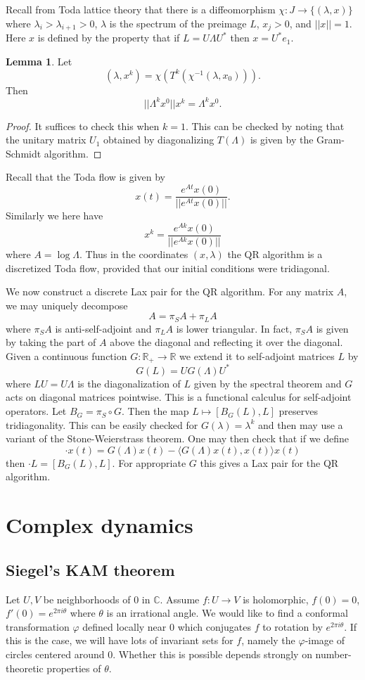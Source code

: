 \documentclass[12pt]{report}
\newcommand{\RR}{\mathbb{R}}
\newcommand{\CC}{\mathbb{C}}
\theoremstyle{definition}
\newtheorem{lemma}[theorem]{Lemma}
\begin{document}
Recall from Toda lattice theory that there is a diffeomorphism $\chi: J \to \{(\lambda, x)\}$ where $\lambda_i > \lambda_{i+1} > 0$, $\lambda$ is the spectrum of the preimage $L$, $x_j > 0$, and $||x|| = 1$.
Here $x$ is defined by the property that if $L = U\Lambda U^*$ then $x = U^*e_1$.
\begin{lemma}
Let
$$(\lambda, x^k) = \chi(T^k(\chi^{-1}(\lambda, x_0))).$$
Then
$$||\Lambda^k x^0|| x^k = \Lambda^k x^0.$$
\end{lemma}
\begin{proof}
It suffices to check this when $k = 1$. This can be checked by noting that the unitary matrix $U_1$ obtained by diagonalizing $T(\Lambda)$ is given by the Gram-Schmidt algorithm.
\end{proof}
Recall that the Toda flow is given by
$$x(t) = \frac{e^{At}x(0)}{||e^{At}x(0)||}.$$
Similarly we here have
$$x^k = \frac{e^{Ak} x(0)}{||e^{Ak} x(0)||}$$
where $A = \log \Lambda$.
Thus in the coordinates $(x, \lambda)$ the QR algorithm is a discretized Toda flow, provided that our initial conditions were tridiagonal.

We now construct a discrete Lax pair for the QR algorithm. For any matrix $A$, we may uniquely decompose
$$A = \pi_SA + \pi_LA$$
where $\pi_SA$ is anti-self-adjoint and $\pi_LA$ is lower triangular. In fact, $\pi_SA$ is given by taking the part of $A$ above the diagonal and reflecting it over the diagonal.
Given a continuous function $G: \RR_+ \to \RR$ we extend it to self-adjoint matrices $L$ by
$$G(L) = U G(\Lambda) U^*$$
where $LU = U\Lambda$ is the diagonalization of $L$ given by the spectral theorem and $G$ acts on diagonal matrices pointwise.
This is a functional calculus for self-adjoint operators.
Let $B_G = \pi_S \circ G$. Then the map $L \mapsto [B_G(L), L]$ preserves tridiagonality. This can be easily checked for $G(\lambda) = \lambda^k$ and then may use a variant of the Stone-Weierstrass theorem.
One may then check that if we define
$$\cdot x(t) = G(\Lambda)x(t) - \langle G(\Lambda)x(t), x(t)\rangle x(t)$$
then $\cdot L = [B_G(L), L]$. For appropriate $G$ this gives a Lax pair for the QR algorithm.

\chapter{Complex dynamics}
\section{Siegel's KAM theorem}
Let $U,V$ be neighborhoods of $0$ in $\CC$. Assume $f: U \to V$ is holomorphic, $f(0) = 0$, $f'(0) = e^{2\pi i\theta}$ where $\theta$ is an irrational angle.
We would like to find a conformal transformation $\varphi$ defined locally near $0$ which conjugates $f$ to rotation by $e^{2\pi i\theta}$.
If this is the case, we will have lots of invariant sets for $f$, namely the $\varphi$-image of circles centered around $0$.
Whether this is possible depends strongly on number-theoretic properties of $\theta$.
\end{document}
